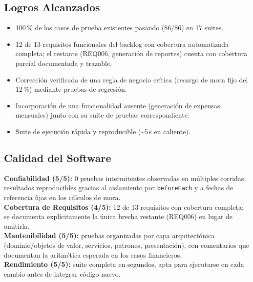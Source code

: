 \documentclass[12pt,a4paper]{article}
\begin{document}
\subsection{Logros Alcanzados}
\begin{itemize}[nosep]
    \item 100\,\% de los casos de prueba existentes pasando (86/86) en 17 suites.
    \item 12 de 13 requisitos funcionales del backlog con cobertura automatizada completa;
    el restante (REQ006, generación de reportes) cuenta con cobertura parcial documentada y
    trazable.
    \item Corrección verificada de una regla de negocio crítica (recargo de mora fijo del
    12\,\%) mediante pruebas de regresión.
    \item Incorporación de una funcionalidad ausente (generación de expensas mensuales)
    junto con su suite de pruebas correspondiente.
    \item Suite de ejecución rápida y reproducible (\textasciitilde 5\,s en caliente).
\end{itemize}

\subsection{Calidad del Software}

\textbf{Confiabilidad (5/5):} 0 pruebas intermitentes observadas en múltiples corridas;
resultados reproducibles gracias al aislamiento por \texttt{beforeEach} y a fechas de
referencia fijas en los cálculos de mora.\\
\textbf{Cobertura de Requisitos (4/5):} 12 de 13 requisitos con cobertura completa; se
documenta explícitamente la única brecha restante (REQ006) en lugar de omitirla.\\
\textbf{Mantenibilidad (5/5):} pruebas organizadas por capa arquitectónica
(dominio/objetos de valor, servicios, patrones, presentación), con comentarios que
documentan la aritmética esperada en los casos financieros.\\
\textbf{Rendimiento (5/5):} suite completa en segundos, apta para ejecutarse en cada
cambio antes de integrar código nuevo.
\end{document}
